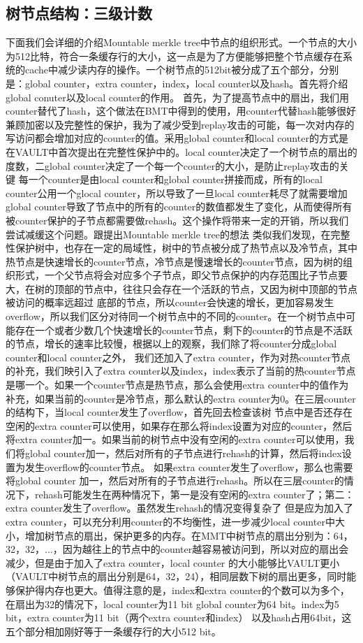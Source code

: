 \subsection{树节点结构：三级计数}
下面我们会详细的介绍Mountable merkle tree中节点的组织形式。一个节点的大小为512比特，符合一条缓存行的大小，这一点是为了方便能够把整个节点缓存在系统的cache中减少读内存的操作。一个树节点的512bit被分成了五个部分，分别是：global counter，extra counter，index，local counter以及hash。首先将介绍global conuter以及local counter的作用。
首先，为了提高节点中的扇出，我们用counter替代了hash，这个做法在BMT中得到的使用，用counter代替hash能够很好兼顾加密以及完整性的保护，我为了减少受到replay攻击的可能，每一次对内存的写访问都会增加对应的counter的值。采用global counter和local counter的方式是在VAULT中首次提出在完整性保护中的。local counter决定了一个树节点的扇出的度数，二global counter决定了一个每一个counter的大小，是防止replay攻击的关键
每一个counter是由local counter和global counter拼接而成，所有的local counter公用一个glocal counter，所以导致了一旦local counter耗尽了就需要增加global counter导致了节点中的所有的counter的数值都发生了变化，从而使得所有被counter保护的子节点都需要做rehash。这个操作将带来一定的开销，所以我们尝试减缓这个问题。跟提出Mountable merkle tree的想法
类似我们发现，在完整性保护树中，也存在一定的局域性，树中的节点被分成了热节点以及冷节点，其中热节点是快速增长的counter节点，冷节点是慢速增长的counter节点，因为树的组织形式，一个父节点将会对应多个子节点，即父节点保护的内存范围比子节点要大，在树的顶部的节点中，往往只会存在一个活跃的节点，又因为树中顶部的节点被访问的概率远超过
底部的节点，所以counter会快速的增长，更加容易发生overflow，所以我们区分对待同一个树节点中的不同的counter。在一个树节点中可能存在一个或者少数几个快速增长的counter节点，剩下的counter的节点是不活跃的节点，增长的速率比较慢，根据以上的观察，我们除了将counter分成global counter和local counter之外，
我们还加入了extra counter，作为对热counter节点的补充，我们映引入了extra counter以及index，index表示了当前的热counter节点是哪一个。如果一个counter节点是热节点，那么会使用extra counter中的值作为补充，如果当前的counter是冷节点，那么默认的extra counter为0。在三层counter的结构下，当local counter发生了overflow，首先回去检查该树
节点中是否还存在空闲的extra counter可以使用，如果存在那么将index设置为对应的counter，然后将extra counter加一。如果当前的树节点中没有空闲的extra counter可以使用，我们将global counter加一，然后对所有的子节点进行rehash的计算，然后将index设置为发生overflow的counter节点。
如果extra counter发生了overflow，那么也需要将global counter 加一，然后对所有的子节点进行rehash。所以在三层counter的情况下，rehash可能发生在两种情况下，第一是没有空闲的extra counter了；第二：extra counter发生了overflow。虽然发生rehash的情况变得复杂了
但是应为加入了extra counter，可以充分利用counter的不均衡性，进一步减少local counter中大小，增加树节点的扇出，保护更多的内存。在MMT中树节点的扇出分别为：64，32，32，...，因为越往上的节点中的counter越容易被访问到，所以对应的扇出会减少，但是由于加入了extra counter，local counter
的大小能够比VAULT更小（VAULT中树节点的扇出分别是64，32，24），相同层数下树的扇出更多，同时能够保护得内存也更大。值得注意的是，index和extra counter的个数可以为多个，在扇出为32的情况下，local counter为11 bit global counter为64 bit。index为5 bit，extra counter为11 bit（两个extra counter和index）
以及hash占用64bit，这五个部分相加刚好等于一条缓存行的大小512 bit。

